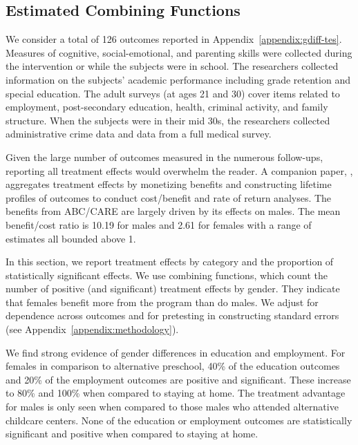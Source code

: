 \subsection{Estimated Combining Functions}

We consider a total of 126 outcomes reported in Appendix~\ref{appendix:gdiff-tes}. Measures of cognitive, social-emotional, and parenting skills were collected during the intervention or while the subjects were in school. The researchers collected information on the subjects' academic performance including grade retention and special education. The adult surveys (at ages 21 and 30) cover items related to employment, post-secondary education, health, criminal activity, and family structure. When the subjects were in their mid 30s, the researchers collected administrative crime data and data from a full medical survey.

Given the large number of outcomes measured in the numerous follow-ups, reporting all treatment effects would overwhelm the reader. A companion paper, \citet{Garcia_Heckman_Leaf_etal_2017_Comp_CBA_Unpublished}, aggregates treatment effects by monetizing benefits and constructing lifetime profiles of outcomes to conduct cost/benefit and rate of return analyses. The benefits from ABC/CARE are largely driven by its effects on males. The mean benefit/cost ratio is 10.19 for males and 2.61 for females with a range of estimates all bounded above 1.

In this section, we report treatment effects by category and the proportion of statistically significant effects. We use combining functions, which count the number of positive (and significant) treatment effects by gender. They indicate that females benefit more from the program than do males. We adjust for dependence across outcomes and for pretesting in constructing standard errors (see Appendix~\ref{appendix:methodology}).

We find strong evidence of gender differences in education and employment. For females in comparison to alternative preschool, 40\% of the education outcomes and 20\% of the employment outcomes are positive and significant. These increase to 80\% and 100\% when compared to staying at home. The treatment advantage for males is only seen when compared to those males who attended alternative childcare centers. None of the education or employment outcomes are statistically significant and positive when compared to staying at home.


